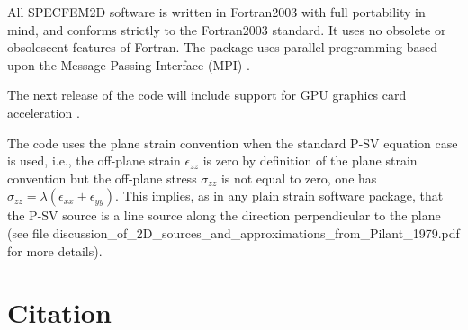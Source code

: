 \documentclass[oneside,english,onecolumn,letterpaper]{book}
\begin{document}
All SPECFEM2D software is written in Fortran2003 with full portability
in mind, and conforms strictly to the Fortran2003 standard. It uses
no obsolete or obsolescent features of Fortran. The package uses
parallel programming based upon the Message Passing Interface (MPI)
\citep{GrLuSk94,Pac97}.

The next release of the code will include support for GPU graphics card acceleration \citep{Kom11,MiKo10,KoMiEr09,KoErGoMi10}.

The code uses the plane strain convention when the standard P-SV equation case is used, i.e.,
the off-plane strain $\epsilon_{zz}$ is zero by definition of the plane strain convention but the off-plane stress $\sigma_{zz}$ is not equal to zero,
one has $\sigma_{zz} = \lambda (\epsilon_{xx} + \epsilon_{yy})$.
This implies, as in any plain strain software package, that the P-SV source is a line source along the direction perpendicular to the plane (see file
discussion\_of\_2D\_sources\_and\_approximations\_from\_Pilant\_1979.pdf for more details).

\section{Citation}
\end{document}
